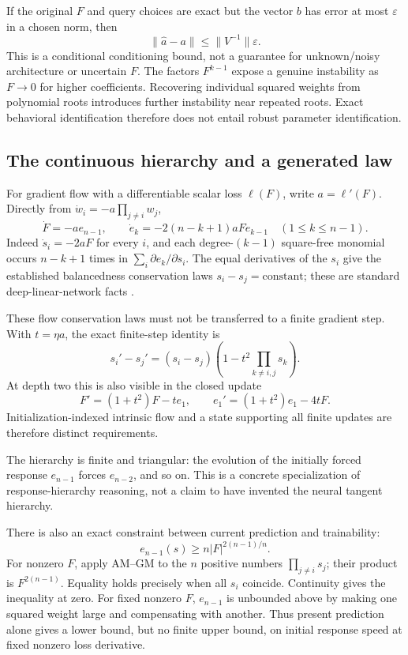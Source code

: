 \documentclass[11pt]{article}
\theoremstyle{definition}\newtheorem{definition}[theorem]{Definition}
\theoremstyle{remark}\newtheorem{remark}[theorem]{Remark}
\begin{document}
If the original $F$ and query choices are exact but the vector $b$ has error at most $\varepsilon$ in a chosen norm, then
\[
 \|\widehat a-a\|\le\|V^{-1}\|\varepsilon.
\]
This is a conditional conditioning bound, not a guarantee for unknown/noisy architecture or uncertain $F$. The factors $F^{k-1}$ expose a genuine instability as $F\to0$ for higher coefficients. Recovering individual squared weights from polynomial roots introduces further instability near repeated roots. Exact behavioral identification therefore does not entail robust parameter identification.

\subsection{The continuous hierarchy and a generated law}
For gradient flow with a differentiable scalar loss $\ell(F)$, write $a=\ell'(F)$. Directly from $\dot w_i=-a\prod_{j\ne i}w_j$,
\begin{equation}\label{eq:flow}
 \dot F=-a e_{n-1},\qquad
 \dot e_k=-2(n-k+1)aF e_{k-1}\quad(1\le k\le n-1).
\end{equation}
Indeed $\dot s_i=-2aF$ for every $i$, and each degree-$(k-1)$ square-free monomial occurs $n-k+1$ times in $\sum_i\partial e_k/\partial s_i$. The equal derivatives of the $s_i$ give the established balancedness conservation laws $s_i-s_j=\mathrm{constant}$; these are standard deep-linear-network facts \cite{saxe,du}.

These flow conservation laws must not be transferred to a finite gradient step. With $t=\eta a$, the exact finite-step identity is
\[
 s_i'-s_j'=(s_i-s_j)\left(1-t^2\prod_{k\ne i,j}s_k\right).
\]
At depth two this is also visible in the closed update
\[
 F'=(1+t^2)F-te_1,\qquad e_1'=(1+t^2)e_1-4tF.
\]
Initialization-indexed intrinsic flow and a state supporting all finite updates are therefore distinct requirements.

The hierarchy is finite and triangular: the evolution of the initially forced response $e_{n-1}$ forces $e_{n-2}$, and so on. This is a concrete specialization of response-hierarchy reasoning, not a claim to have invented the neural tangent hierarchy.

There is also an exact constraint between current prediction and trainability:
\begin{equation}\label{eq:amgm}
 e_{n-1}(s)\ge n|F|^{2(n-1)/n}.
\end{equation}
For nonzero $F$, apply AM--GM to the $n$ positive numbers $\prod_{j\ne i}s_j$; their product is $F^{2(n-1)}$. Equality holds precisely when all $s_i$ coincide. Continuity gives the inequality at zero. For fixed nonzero $F$, $e_{n-1}$ is unbounded above by making one squared weight large and compensating with another. Thus present prediction alone gives a lower bound, but no finite upper bound, on initial response speed at fixed nonzero loss derivative.
\end{document}
